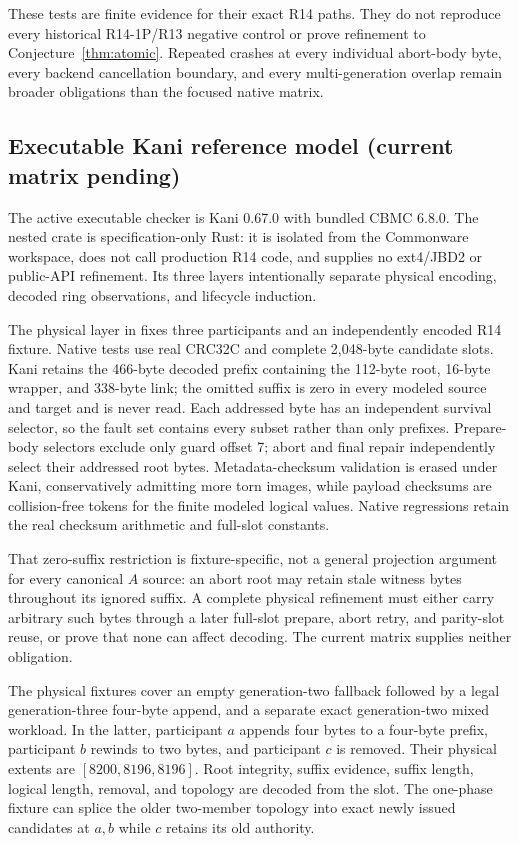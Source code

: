 \documentclass[10pt,twocolumn]{article}
\theoremstyle{remark}
\begin{document}
These tests are finite evidence for their exact R14 paths. They do not reproduce every historical
R14-1P/R13 negative control or prove refinement to Conjecture~\ref{thm:atomic}. Repeated crashes at
every individual abort-body byte, every backend cancellation boundary, and every multi-generation
overlap remain broader obligations than the focused native matrix.

\subsection{Executable Kani reference model (current matrix pending)}

The active executable checker is Kani 0.67.0 with bundled CBMC 6.8.0. The nested crate
 is specification-only Rust: it is isolated from the Commonware workspace,
does not call production R14 code, and supplies no ext4/JBD2 or public-API refinement. Its three
layers intentionally separate physical encoding, decoded ring observations, and lifecycle
induction.

The physical layer in  fixes three participants and an independently encoded R14 fixture.
Native tests use real CRC32C and complete 2,048-byte candidate slots. Kani retains the 466-byte
decoded prefix containing the 112-byte root, 16-byte wrapper, and 338-byte link; the omitted suffix
is zero in every modeled source and target and is never read. Each addressed byte has an independent
survival selector, so the fault set contains every subset rather than only prefixes. Prepare-body
selectors exclude only guard offset 7; abort and final repair independently select their addressed
root bytes. Metadata-checksum validation is erased under Kani, conservatively admitting more torn
images, while payload checksums are collision-free tokens for the finite modeled logical values.
Native regressions retain the real checksum arithmetic and full-slot constants.

That zero-suffix restriction is fixture-specific, not a general projection argument for every
canonical $A$ source: an abort root may retain stale witness bytes throughout its ignored suffix.
A complete physical refinement must either carry arbitrary such bytes through a later full-slot
prepare, abort retry, and parity-slot reuse, or prove that none can affect decoding. The current
matrix supplies neither obligation.

The physical fixtures cover an empty generation-two fallback followed by a legal generation-three
four-byte append, and a separate exact generation-two mixed workload. In the latter, participant
$a$ appends four bytes to a four-byte prefix, participant $b$ rewinds to two bytes, and participant
$c$ is removed. Their physical extents are $[8200,8196,8196]$. Root integrity, suffix evidence,
suffix length, logical length, removal, and topology are decoded from the slot. The one-phase fixture
can splice the older two-member topology into exact newly issued candidates at $a,b$ while $c$
retains its old authority.
\end{document}

